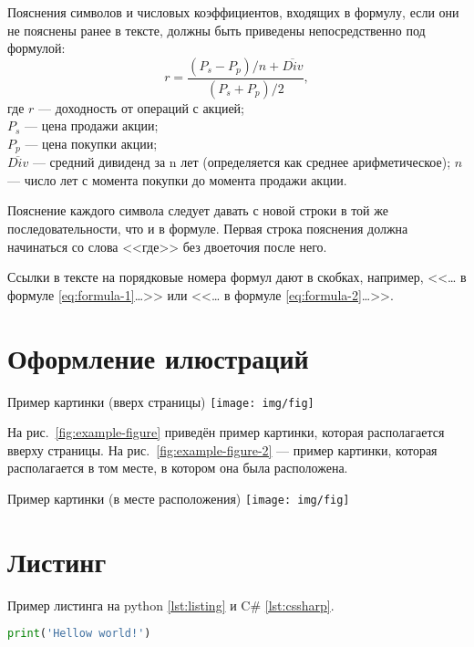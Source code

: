 \documentclass[PI,Study]{HSEUniversity}
\begin{document}
Пояснения символов и числовых коэффициентов, входящих в формулу, если они не пояснены ранее в тексте, должны быть приведены непосредственно под формулой:
\begin{equation}
	r = \frac{(P_s-P_p)/n + \overline{Div}}{(P_s + P_p)/2},
	\label{eq:formula-2}
\end{equation}
где $r$ --- доходность от операций с акцией;\\
$P_s$ --- цена продажи акции;\\
$P_p$ --- цена покупки акции;\\
$\overline{Div}$ --- средний дивиденд за n лет (определяется как среднее арифметическое); 
$n$ --- число лет с момента покупки до момента продажи акции.

Пояснение каждого символа следует давать с новой строки в той же последовательности, что и в формуле. Первая строка пояснения должна начинаться со слова <<где>> без двоеточия после него.

Ссылки в тексте на порядковые номера формул дают в скобках, например, <<\dots{} в формуле \eqref{eq:formula-1}\dots>> или <<\dots{} в формуле \eqref{eq:formula-2}\dots>>.

\section{Оформление илюстраций}

\begin{FIGURE}[t]{Пример картинки (вверх страницы)\label{fig:example-figure}}
	\texttt{[image: img/fig]}
\end{FIGURE}

На рис.~\ref{fig:example-figure} приведён пример картинки, которая располагается вверху страницы. На рис.~\ref{fig:example-figure-2} --- пример картинки, которая располагается в том месте, в котором она была расположена.

\begin{FIGURE}[h]{Пример картинки (в месте расположения) \label{fig:example-figure-2}}
	\texttt{[image: img/fig]}
\end{FIGURE}

\section{Листинг}
Пример листинга на python \ref{lst:listing} и C\# \ref{lst:cssharp}.
\begin{lstlisting}[language=python, label=lst:listing, caption={Пример листинга на питоне},numbers=none]
print('Hellow world!')
\end{lstlisting}
\end{document}
